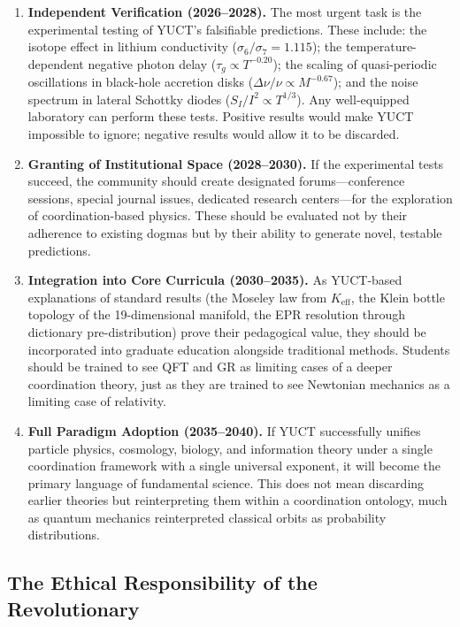 \documentclass[12pt,a4paper]{article}
\begin{document}
	\begin{enumerate}
		\item \textbf{Independent Verification (2026--2028).} The most urgent task is the experimental testing of YUCT's falsifiable predictions. These include: the isotope effect in lithium conductivity (\(\sigma_6/\sigma_7 = 1.115\)); the temperature-dependent negative photon delay (\(\tau_g \propto T^{-0.20}\)); the scaling of quasi-periodic oscillations in black-hole accretion disks (\(\Delta\nu/\nu \propto M^{-0.67}\)); and the noise spectrum in lateral Schottky diodes (\(S_I/I^2 \propto T^{1/3}\)). Any well-equipped laboratory can perform these tests. Positive results would make YUCT impossible to ignore; negative results would allow it to be discarded.
		
		\item \textbf{Granting of Institutional Space (2028--2030).} If the experimental tests succeed, the community should create designated forums—conference sessions, special journal issues, dedicated research centers—for the exploration of coordination-based physics. These should be evaluated not by their adherence to existing dogmas but by their ability to generate novel, testable predictions.
		
		\item \textbf{Integration into Core Curricula (2030--2035).} As YUCT-based explanations of standard results (the Moseley law from \(K_{\mathrm{eff}}\), the Klein bottle topology of the 19-dimensional manifold, the EPR resolution through dictionary pre-distribution) prove their pedagogical value, they should be incorporated into graduate education alongside traditional methods. Students should be trained to see QFT and GR as limiting cases of a deeper coordination theory, just as they are trained to see Newtonian mechanics as a limiting case of relativity.
		
		\item \textbf{Full Paradigm Adoption (2035--2040).} If YUCT successfully unifies particle physics, cosmology, biology, and information theory under a single coordination framework with a single universal exponent, it will become the primary language of fundamental science. This does not mean discarding earlier theories but reinterpreting them within a coordination ontology, much as quantum mechanics reinterpreted classical orbits as probability distributions.
	\end{enumerate}
	
	\subsection{The Ethical Responsibility of the Revolutionary}
	
\end{document}
